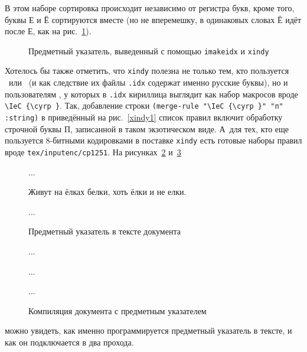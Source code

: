 \documentclass[a4paper,12pt]{article}
\newcommand\package[1]{\texttt{#1}}
\newcommand\exe[1]{\texttt{#1}}
\newcommand\file[1]{\texttt{#1}}
\begin{document}
В этом наборе сортировка происходит независимо от регистра букв, кроме того, буквы
Е и Ё сортируются вместе (но не вперемешку, в одинаковых словах Ё идёт после Е,
как на рис.~\ref{xindy4}).
\begin{figure}[tp]
\begin{tcolorbox}[colback=white,colframe=white]
\centering
\small
\vspace*{-2ex}
\printindex
\end{tcolorbox}
\caption{Предметный указатель, выведенный с помощью \package{imakeidx} и
\exe{xindy}}\label{xindy4}
\end{figure}
Хотелось бы также отметить, что \exe{xindy} полезна не только тем, кто пользуется
\LuaLaTeX\ или \XeTeX\ (и как следствие их файлы \file{.idx} содержат именно русские буквы),
но и пользователям \pdfLaTeX, у которых в \file{.idx} кириллица выглядит как набор макросов
вроде \verb|\IeC {\cyrp }|. Так, добавление строки
\verb|(merge-rule "\IeC {\cyrp }" "п" :string)| в приведённый на рис.~\ref{xindy1} список правил
включит обработку строчной буквы П, записанной в таком экзотическом виде. А~для тех, кто
еще пользуется 8-битными кодировками в поставке \exe{xindy} есть готовые наборы правил
вроде \file{tex/inputenc/cp1251}.
На рисунках~\ref{xindy2} и~\ref{xindy3}
\begin{figure}[tp]
\begin{latexcode}
\usepackage[xindy,noautomatic]{imakeidx}
\makeindex

...

Живут на ёлках белки, хоть ёлки и не елки.

...

\printindex
\end{latexcode}
\caption{Предметный указатель в тексте документа}\label{xindy2}
\end{figure}
\begin{figure}[tp]
\begin{shcode}

...


...


...

%
\end{shcode}
\caption{Компиляция документа с предметным указателем}\label{xindy3}
\end{figure}
можно увидеть, как именно программируется
предметный указатель в тексте, и как он подключается в два прохода.
\end{document}
